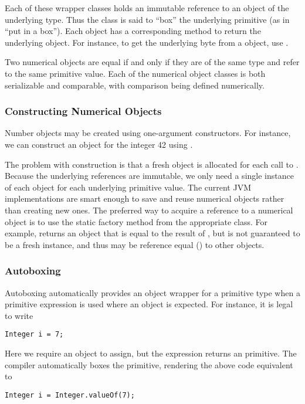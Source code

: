 Each of these wrapper classes holds an immutable reference to an
object of the underlying type.  Thus the class is said to ``box'' the
underlying primitive (as in ``put in a box'').  Each object has a
corresponding method to return the underlying object.  For instance,
to get the underlying byte from a  object, use
.

Two numerical objects are equal if and only
if they are of the same type and refer to the same primitive value.
Each of the numerical object classes is both serializable and
comparable, with comparison being defined numerically.


\subsubsection{Constructing Numerical Objects}

Number objects may be created using one-argument constructors.  For
instance, we can construct an object for the integer 42 using
.  

The problem with construction is that a fresh object is allocated for
each call to .  Because the underlying references are
immutable, we only need a single instance of each object for each
underlying primitive value.  The current JVM implementations are smart
enough to save and reuse numerical objects rather than creating new
ones.  The preferred way to acquire a reference to a numerical object
is to use the  static factory method from the
appropriate class.  For example,  returns an
object that is equal to the result of , but is
not guaranteed to be a fresh instance, and thus may be reference equal
(\code{==}) to other  objects.

\subsubsection{Autoboxing}\label{section:java-autoboxing}

Autoboxing automatically provides an object wrapper for a primitive
type when a primitive expression is used where an object is expected.
For instance, it is legal to write
%
\begin{verbatim}
Integer i = 7;
\end{verbatim}
%
Here we require an  object to assign, but the expression
 returns an  primitive.  The compiler automatically
boxes the primitive, rendering the above code equivalent to
%
\begin{verbatim}
Integer i = Integer.valueOf(7);
\end{verbatim}

